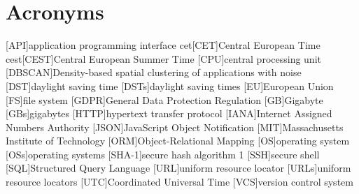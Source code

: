 \chapter*{Acronyms}
\begin{acronym}
    [API]{application programming interface}
    \ac{cet}[CET]{Central European Time}
    \ac{cest}[CEST]{Central European Summer Time}
    [CPU]{central processing unit}
    [DBSCAN]{Density-based spatial clustering of applications with noise}
    [DST]{daylight saving time}
    [DSTs]{daylight saving times}
    [EU]{European Union}
    [FS]{file system}
    [GDPR]{General Data Protection Regulation}
    [GB]{Gigabyte}
    [GBs]{gigabytes}
    [HTTP]{hypertext transfer protocol}
    [IANA]{Internet Assigned Numbers Authority}
    [JSON]{JavaScript Object Notification}
    [MIT]{Massachusetts Institute of Technology}
    [ORM]{Object-Relational Mapping}
    [OS]{operating system}
    [OSs]{operating systems}
    [SHA-1]{secure hash algorithm 1}
    [SSH]{secure shell}
    [SQL]{Structured Query Language}
    [URL]{uniform resource locator}
    [URLs]{uniform resource locators}
    [UTC]{Coordinated Universal Time}
    [VCS]{version control system}
\end{acronym}
